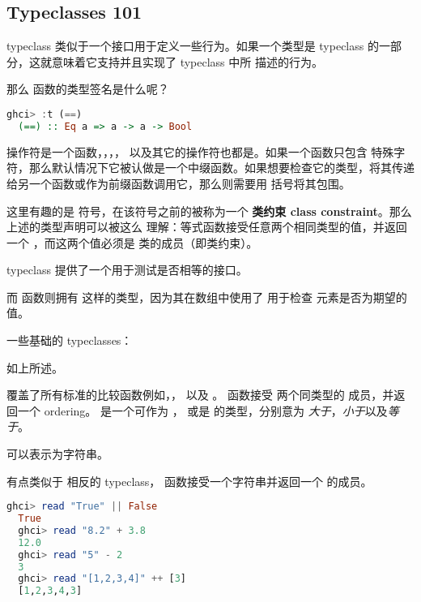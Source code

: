\documentclass[./main.tex]{subfiles}
\begin{document}
\subsection*{Typeclasses 101}

typeclass 类似于一个接口用于定义一些行为。如果一个类型是 typeclass 的一部分，这就意味着它支持并且实现了 typeclass 中所
描述的行为。

那么 \acode{==} 函数的类型签名是什么呢？

\begin{lstlisting}[language=Haskell]
  ghci> :t (==)
  (==) :: Eq a => a -> a -> Bool
\end{lstlisting}

\begin{anote}
  \acode{==} 操作符是一个函数，\acode{+}，\acode{*}，\acode{-}，\acode{/} 以及其它的操作符也都是。如果一个函数只包含
  特殊字符，那么默认情况下它被认做是一个中缀函数。如果想要检查它的类型，将其传递给另一个函数或作为前缀函数调用它，那么则需要用
  括号将其包围。
\end{anote}

这里有趣的是 \acode{=>} 符号，在该符号之前的被称为一个 \textbf{类约束 class constraint}。那么上述的类型声明可以被这么
理解：等式函数接受任意两个相同类型的值，并返回一个 ，而这两个值必须是  类的成员（即类约束）。

 typeclass 提供了一个用于测试是否相等的接口。

而  函数则拥有  这样的类型，因为其在数组中使用了 \acode{==} 用于检查
元素是否为期望的值。

一些基础的 typeclasses：

 如上所述。

 覆盖了所有标准的比较函数例如\acode{>}，\acode{<}，\acode{>=} 以及 \acode{<=}。 函数接受
两个同类型的  成员，并返回一个 ordering。 是一个可作为 ， 或是 
的类型，分别意为 \textit{大于}，\textit{小于}以及\textit{等于}。

 可以表示为字符串。

 有点类似于  相反的 typeclass， 函数接受一个字符串并返回一个  的成员。

\begin{lstlisting}[language=Haskell]
  ghci> read "True" || False
  True
  ghci> read "8.2" + 3.8
  12.0
  ghci> read "5" - 2
  3
  ghci> read "[1,2,3,4]" ++ [3]
  [1,2,3,4,3]
\end{lstlisting}
\end{document}
